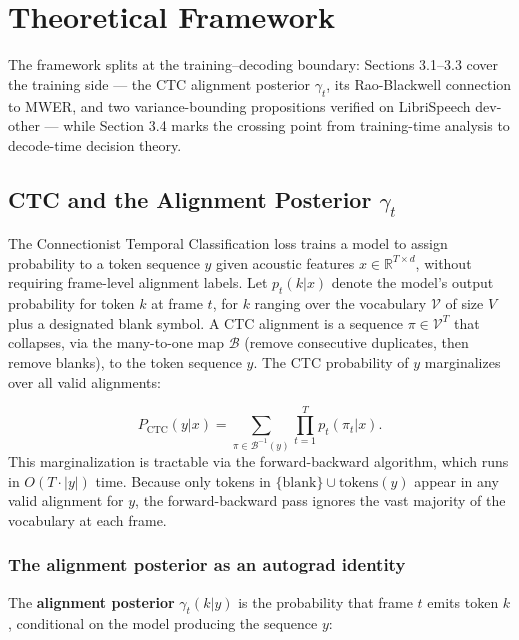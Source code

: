 \section{Theoretical Framework}
\label{sec:theory}

The framework splits at the training–decoding boundary: Sections 3.1–3.3 cover the training side — the CTC alignment posterior $\gamma_t$, its Rao-Blackwell connection to MWER, and two variance-bounding propositions verified on LibriSpeech dev-other — while Section 3.4 marks the crossing point from training-time analysis to decode-time decision theory.



\subsection{CTC and the Alignment Posterior $\gamma_t$}

The Connectionist Temporal Classification loss \cite{graves2006ctc} trains a model to assign probability to a token sequence $y$ given acoustic features $x \in \mathbb{R}^{T \times d}$, without requiring frame-level alignment labels. Let $p_t(k|x)$ denote the model's output probability for token $k$ at frame $t$, for $k$ ranging over the vocabulary $\mathcal{V}$ of size $V$ plus a designated blank symbol. A CTC alignment is a sequence $\pi \in \mathcal{V}^T$ that collapses, via the many-to-one map $\mathcal{B}$ (remove consecutive duplicates, then remove blanks), to the token sequence $y$. The CTC probability of $y$ marginalizes over all valid alignments:

\begin{equation*}
P_\text{CTC}(y|x) = \sum_{\pi \in \mathcal{B}^{-1}(y)} \prod_{t=1}^{T} p_t(\pi_t | x). \tag{1}
\end{equation*}
This marginalization is tractable via the forward-backward algorithm, which runs in $O(T \cdot |y|)$ time. Because only tokens in $\{\text{blank}\} \cup \text{tokens}(y)$ appear in any valid alignment for $y$, the forward-backward pass ignores the vast majority of the vocabulary at each frame.

\subsubsection{The alignment posterior as an autograd identity}

The \textbf{alignment posterior} $\gamma_t(k|y)$ is the probability that frame $t$ emits token $k$, conditional on the model producing the sequence $y$:

